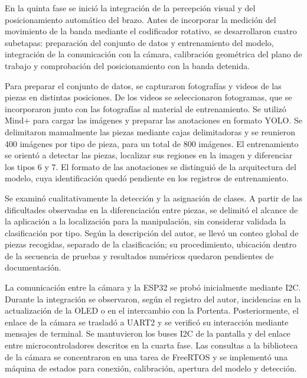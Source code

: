 
En la quinta fase se inició la integración de la percepción visual y del posicionamiento automático del brazo. Antes de incorporar la medición del movimiento de la banda mediante el codificador rotativo, se desarrollaron cuatro subetapas: preparación del conjunto de datos y entrenamiento del modelo, integración de la comunicación con la cámara, calibración geométrica del plano de trabajo y comprobación del posicionamiento con la banda detenida.

Para preparar el conjunto de datos, se capturaron fotografías y videos de las piezas en distintas posiciones. De los videos se seleccionaron fotogramas, que se incorporaron junto con las fotografías al material de entrenamiento. Se utilizó Mind+ para cargar las imágenes y preparar las anotaciones en formato YOLO. Se delimitaron manualmente las piezas mediante cajas delimitadoras y se reunieron 400 imágenes por tipo de pieza, para un total de 800 imágenes. El entrenamiento se orientó a detectar las piezas, localizar sus regiones en la imagen y diferenciar los tipos 6 y 7. El formato de las anotaciones se distinguió de la arquitectura del modelo, cuya identificación quedó pendiente en los registros de entrenamiento.

Se examinó cualitativamente la detección y la asignación de clases. A partir de las dificultades observadas en la diferenciación entre piezas, se delimitó el alcance de la aplicación a la localización para la manipulación, sin considerar validada la clasificación por tipo. Según la descripción del autor, se llevó un conteo global de piezas recogidas, separado de la clasificación; su procedimiento, ubicación dentro de la secuencia de pruebas y resultados numéricos quedaron pendientes de documentación.

La comunicación entre la cámara y la ESP32 se probó inicialmente mediante I2C. Durante la integración se observaron, según el registro del autor, incidencias en la actualización de la OLED o en el intercambio con la Portenta. Posteriormente, el enlace de la cámara se trasladó a UART2 y se verificó su interacción mediante mensajes de terminal. Se mantuvieron los buses I2C de la pantalla y del enlace entre microcontroladores descritos en la cuarta fase. Las consultas a la biblioteca de la cámara se concentraron en una tarea de FreeRTOS y se implementó una máquina de estados para conexión, calibración, apertura del modelo y detección.

